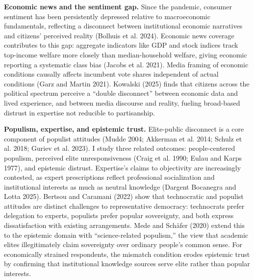 \documentclass[
  12pt]{article}
\begin{document}
\textbf{Economic news and the sentiment gap.} Since the pandemic,
consumer sentiment has been persistently depressed relative to
macroeconomic fundamentals, reflecting a disconnect between
institutional economic narratives and citizens' perceived reality
(Bolhuis et al. 2024). Economic news coverage contributes to this gap:
aggregate indicators like GDP and stock indices track top-income welfare
more closely than median-household welfare, giving economic reporting a
systematic class bias (Jacobs et al. 2021). Media framing of economic
conditions causally affects incumbent vote shares independent of actual
conditions (Garz and Martin 2021). Kowalski (2025) finds that citizens
across the political spectrum perceive a ``double disconnect'' between
economic data and lived experience, and between media discourse and
reality, fueling broad-based distrust in expertise not reducible to
partisanship.

\textbf{Populism, expertise, and epistemic trust.} Elite-public
disconnect is a core component of populist attitudes (Mudde 2004;
Akkerman et al. 2014; Schulz et al. 2018; Guriev et al. 2023). I study
three related outcomes: people-centered populism, perceived elite
unresponsiveness (Craig et al. 1990; Eulau and Karps 1977), and
epistemic distrust. Expertise's claims to objectivity are increasingly
contested, as expert prescriptions reflect professional socialization
and institutional interests as much as neutral knowledge (Dargent
Bocanegra and Lotta 2025). Bertsou and Caramani (2022) show that
technocratic and populist attitudes are distinct challenges to
representative democracy: technocrats prefer delegation to experts,
populists prefer popular sovereignty, and both express dissatisfaction
with existing arrangements. Mede and Schäfer (2020) extend this to the
epistemic domain with ``science-related populism,'' the view that
academic elites illegitimately claim sovereignty over ordinary people's
common sense. For economically strained respondents, the mismatch
condition erodes epistemic trust by confirming that institutional
knowledge sources serve elite rather than popular interests.
\end{document}
